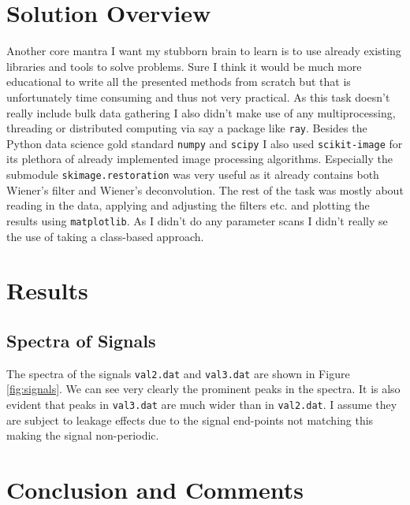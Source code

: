 \documentclass[10pt, titlepage, a4paper]{article}
\begin{document}
\section{Solution Overview}
Another core mantra I want my stubborn brain to learn is to use already existing libraries and tools to solve problems. Sure I think it would be much more 
educational to write all the presented methods from scratch but that is unfortunately time consuming and thus not very practical. As this task doesn't really 
include bulk data gathering I also didn't make use of any multiprocessing, threading or distributed computing via say a package like \texttt{ray}. Besides the 
Python data science gold standard \texttt{numpy} and \texttt{scipy} I also used \texttt{scikit-image} for its plethora of already implemented image processing 
algorithms. Especially the submodule \texttt{skimage.restoration} was very useful as it already contains both Wiener's filter and Wiener's deconvolution. The rest 
of the task was mostly about reading in the data, applying and adjusting the filters etc. and plotting the results using \texttt{matplotlib}. As I didn't do any parameter 
scans I didn't really se the use of taking a class-based approach.
\section{Results}
\subsection{Spectra of Signals}
The spectra of the signals \texttt{val2.dat} and \texttt{val3.dat} are shown in Figure \ref{fig:signals}. We can see very clearly the prominent peaks in the spectra.
It is also evident that peaks in \texttt{val3.dat} are much wider than in \texttt{val2.dat}. I assume they are subject to leakage effects due to the 
signal end-points not matching this making the signal non-periodic. 

\section{Conclusion and Comments}

% 
% 

\end{document}
